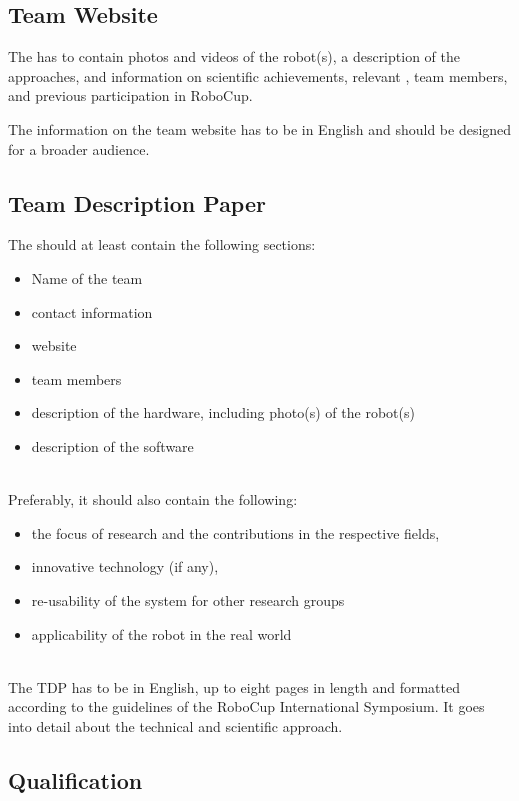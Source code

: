 \subsection{Team Website}

The  has to contain photos and videos of the
robot(s), a description of the approaches, and information on
scientific achievements, relevant , team members,
and previous participation in RoboCup.

The information on the team website has to be in English and should be designed for a broader audience.

\subsection{Team Description Paper}\label{rule:website_tdp}
The  should at least contain the following sections:
\begin{itemize}
\item Name of the team
\item contact information
\item website
\item team members
\item description of the hardware, including photo(s) of the robot(s)
\item description of the software
\end{itemize}

~\\\noindent Preferably, it should also contain the following:
\begin{itemize}
\item the focus of research and the contributions in the respective fields, 
\item innovative technology (if any), 
\item re-usability of the system for other research groups
\item applicability of the robot in the real world
\end{itemize}

~\\\noindent The TDP has to be in English, up to eight pages in length and formatted according to the guidelines of the RoboCup International Symposium.
It goes into detail about the technical and scientific approach.


\subsection{Qualification}
\label{rule:qualification}

